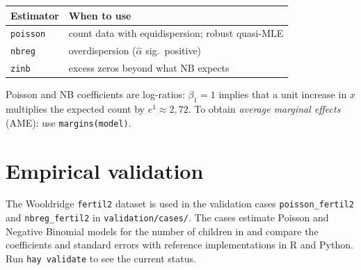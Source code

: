 \begin{center}
\begin{tabular}{ll}
\toprule
\textbf{Estimator} & \textbf{When to use} \\
\midrule
\texttt{poisson}  & count data with equidispersion; robust quasi-MLE \\
\texttt{nbreg}    & overdispersion ($\hat\alpha$ sig.\ positive) \\
\texttt{zinb}     & excess zeros beyond what NB expects \\
\bottomrule
\end{tabular}
\end{center}

\begin{nota}
  Poisson and NB coefficients are log-ratios: $\beta_1 = 1$ implies that a
  unit increase in $x$ multiplies the expected count by $e^1 \approx 2{,}72$.
  To obtain \emph{average marginal effects} (AME): use
  \lstinline{margins(model)}.
\end{nota}

\section{Empirical validation}

The Wooldridge \texttt{fertil2} dataset is used in the validation cases
\texttt{poisson\_fertil2} and \texttt{nbreg\_fertil2} in \texttt{validation/cases/}.
The cases estimate Poisson and Negative Binomial models for the number of
children in \hayashi{} and compare the coefficients and standard errors with
reference implementations in R and Python. Run \lstinline{hay validate} to see the
current status.
